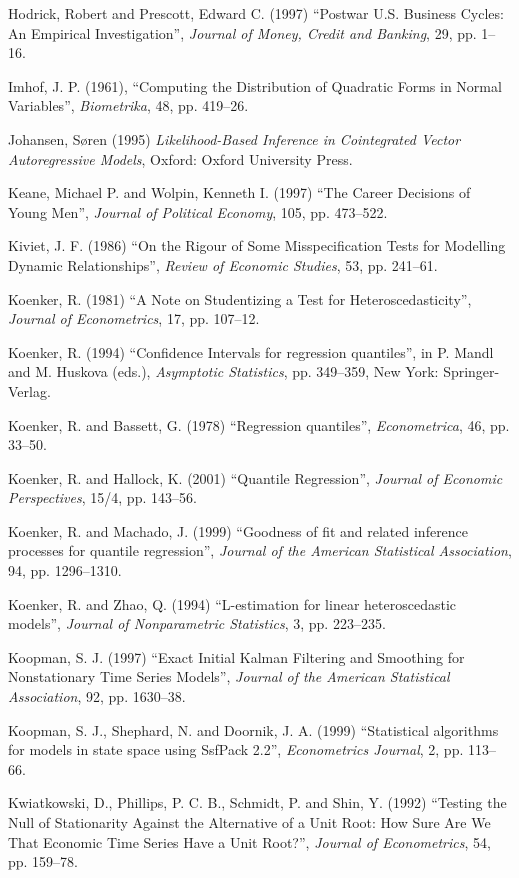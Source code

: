 \begin{thebibliography}
  Hodrick, Robert and Prescott, Edward C. (1997) ``Postwar U.S. Business
  Cycles: An Empirical Investigation'', \emph{Journal of Money, Credit and
  Banking}, 29, pp. 1--16.

  Imhof, J. P. (1961), ``Computing the Distribution of Quadratic Forms
  in Normal Variables'', \emph{Biometrika}, 48, pp. 419--26.

  Johansen, S\o{}ren (1995) \emph{Likelihood-Based Inference in
    Cointegrated Vector Autoregressive Models}, Oxford: Oxford
  University Press.

  Keane, Michael P. and Wolpin, Kenneth I. (1997) ``The Career
  Decisions of Young Men'', \emph{Journal of Political Economy}, 105,
  pp. 473--522.

  Kiviet, J. F. (1986) ``On the Rigour of Some Misspecification Tests
  for Modelling Dynamic Relationships'', \emph{Review of Economic
    Studies}, 53, pp. 241--61.

  Koenker, R. (1981) ``A Note on Studentizing a Test for
  Heteroscedasticity'', \emph{Journal of Econometrics}, 17,
  pp. 107--12.

  Koenker, R. (1994) ``Confidence Intervals for regression
  quantiles'', in P. Mandl and M. Huskova (eds.), \emph{Asymptotic
    Statistics}, pp. 349--359, New York: Springer-Verlag.

  Koenker, R. and Bassett, G. (1978) ``Regression quantiles'',
  \emph{Econometrica}, 46, pp. 33--50.

  Koenker, R. and Hallock, K. (2001) ``Quantile Regression'',
  \emph{Journal of Economic Perspectives}, 15/4, pp. 143--56.

  Koenker, R. and Machado, J. (1999) ``Goodness of fit and related
  inference processes for quantile regression'', \emph{Journal of the
    American Statistical Association}, 94, pp. 1296--1310.

  Koenker, R. and Zhao, Q. (1994) ``L-estimation for linear
  heteroscedastic models'', \emph{Journal of Nonparametric
    Statistics}, 3, pp. 223--235.

  Koopman, S. J. (1997) ``Exact Initial Kalman Filtering and
  Smoothing for Nonstationary Time Series Models'', \emph{Journal of
    the American Statistical Association}, 92, pp. 1630--38.

  Koopman, S. J., Shephard, N. and Doornik, J. A. (1999) 
  ``Statistical algorithms for models in state space using SsfPack
  2.2'', \emph{Econometrics Journal}, 2, pp. 113--66.

  Kwiatkowski, D., Phillips, P. C. B., Schmidt, P. and Shin, Y. (1992)
  ``Testing the Null of Stationarity Against the Alternative of a Unit
  Root: How Sure Are We That Economic Time Series Have a Unit Root?'',
  \emph{Journal of Econometrics}, 54, pp. 159--78.


\end{thebibliography}
